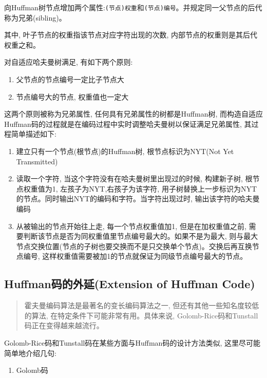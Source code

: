 \documentclass{article}
\begin{document}
\begin{CJK}{UTF8}{gbsn}
向Huffman树节点增加两个属性:\texttt{(节点)权重}和\texttt{(节点)编号}。并规定同一父节点的后代称为兄弟(sibling)。

其中, 叶子节点的权重指该节点对应字符出现的次数, 内部节点的权重则是其后代权重之和。

对自适应哈夫曼树满足, 有如下两个原则:

\begin{enumerate}
\def\labelenumi{\arabic{enumi}.}
\item
  父节点的节点编号一定比子节点大
\item
  节点编号大的节点, 权重值也一定大
\end{enumerate}

这两个原则被称为兄弟属性, 任何具有兄弟属性的树都是Huffman树, 而构造自适应Huffman码的过程就是在编码过程中实时调整哈夫曼树以保证满足兄弟属性, 其过程简单描述如下:

\begin{enumerate}
\def\labelenumi{\arabic{enumi}.}
\item
  建立只有一个节点(根节点)的Huffman树, 根节点标识为NYT(Not Yet Transmitted)
\item
  读取一个字符, 当这个字符没有在哈夫曼树里出现过的时候, 构建新子树, 根节点权重值为1, 左孩子为NYT,右孩子为该字符, 用子树替换上一步标识为NYT的节点。同时输出NYT的编码和字符。当字符出现过时, 输出该字符的哈夫曼编码
\item
  从被输出的节点开始往上走, 每一个节点权重值加1, 但是在加权重值之前, 需要判断该节点是否为同权重值里节点编号最大的。如果不是为最大, 则与最大节点交换位置(节点的子树也要交换而不是只交换单个节点)。交换后再互换节点编号, 这样权重值需要被加1的节点就保证为同级节点编号最大的节点。
\end{enumerate}

\subsection{Huffman码的外延(Extension of Huffman Code)}\label{header-n574}

\begin{quote}
霍夫曼编码算法是最著名的变长编码算法之一, 但还有其他一些知名度较低的算法, 在特定条件下可能非常有用。具体来说, Golomb-Rice码和Tunstall码正在变得越来越流行。
\end{quote}

Golomb-Rice码和Tunstall码在某些方面与Huffman码的设计方法类似, 这里尽可能简单地介绍几句:

\begin{enumerate}
\def\labelenumi{\arabic{enumi}.}
\item
  Golomb码


\end{enumerate}
\end{CJK}
\end{document}
